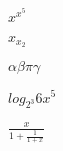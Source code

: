 \documentclass[11pt]{article}
\begin{document}
$x^{x^{5}}$

$x_{x_2}$

$
\alpha
\beta
\pi
\gamma
$

$log_{2^{3}}{6x^5}$

$\displaystyle{\frac{x}{1+\displaystyle{\frac{1}{1+x}}}}$
\end{document}

